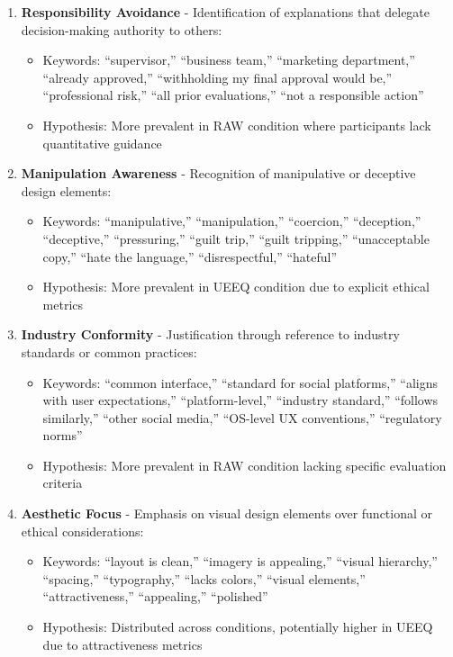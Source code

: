 \begin{enumerate}

\item \textbf{Responsibility Avoidance} - Identification of explanations that delegate decision-making authority to others:
\begin{itemize}
\item Keywords: ``supervisor,'' ``business team,'' ``marketing department,'' ``already approved,'' ``withholding my final approval would be,'' ``professional risk,'' ``all prior evaluations,'' ``not a responsible action''
\item Hypothesis: More prevalent in RAW condition where participants lack quantitative guidance
\end{itemize}

\item \textbf{Manipulation Awareness} - Recognition of manipulative or deceptive design elements:
\begin{itemize}
\item Keywords: ``manipulative,'' ``manipulation,'' ``coercion,'' ``deception,'' ``deceptive,'' ``pressuring,'' ``guilt trip,'' ``guilt tripping,'' ``unacceptable copy,'' ``hate the language,'' ``disrespectful,'' ``hateful''
\item Hypothesis: More prevalent in UEEQ condition due to explicit ethical metrics
\end{itemize}

\item \textbf{Industry Conformity} - Justification through reference to industry standards or common practices:
\begin{itemize}
\item Keywords: ``common interface,'' ``standard for social platforms,'' ``aligns with user expectations,'' ``platform-level,'' ``industry standard,'' ``follows similarly,'' ``other social media,'' ``OS-level UX conventions,'' ``regulatory norms''
\item Hypothesis: More prevalent in RAW condition lacking specific evaluation criteria
\end{itemize}

\item \textbf{Aesthetic Focus} - Emphasis on visual design elements over functional or ethical considerations:
\begin{itemize}
\item Keywords: ``layout is clean,'' ``imagery is appealing,'' ``visual hierarchy,'' ``spacing,'' ``typography,'' ``lacks colors,'' ``visual elements,'' ``attractiveness,'' ``appealing,'' ``polished''
\item Hypothesis: Distributed across conditions, potentially higher in UEEQ due to attractiveness metrics
\end{itemize}


\end{enumerate}
